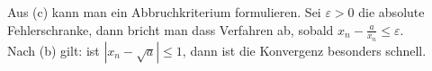 \documentclass[12pt]{article}
\begin{document}
\noindent Aus (c) kann man ein Abbruchkriterium formulieren. Sei $\varepsilon > 0$ die absolute Fehlerschranke, dann bricht man dass Verfahren ab, sobald $x_n- \frac{a}{x_n} \leq \varepsilon$. \\
Nach (b) gilt: ist $|x_n- \sqrt{a}| \leq 1$, dann ist die Konvergenz besonders schnell.

\newpage
\printbibliography[heading=bibintoc]
\end{document}
